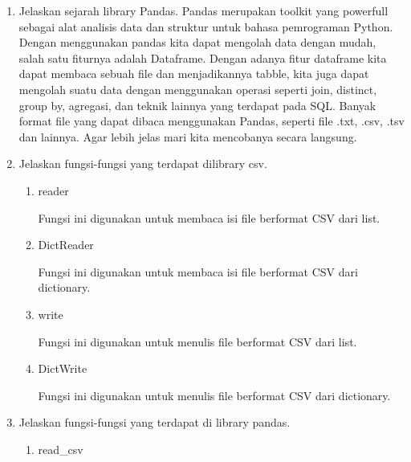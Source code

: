\begin{enumerate}
   \item Jelaskan sejarah library Pandas.
   Pandas merupakan toolkit yang powerfull sebagai alat analisis data dan struktur untuk bahasa pemrograman Python. Dengan menggunakan pandas kita dapat mengolah data dengan mudah, salah satu fiturnya adalah Dataframe. Dengan adanya fitur dataframe kita dapat membaca sebuah file dan menjadikannya tabble, kita juga dapat mengolah suatu data dengan menggunakan operasi seperti join, distinct, group by, agregasi, dan teknik lainnya yang terdapat pada SQL. Banyak format file yang dapat dibaca menggunakan Pandas, seperti file .txt, .csv, .tsv dan lainnya. Agar lebih jelas mari kita mencobanya secara langsung.
   
   \item Jelaskan fungsi-fungsi yang terdapat dilibrary csv.
      \begin{enumerate}
		   \item reader
		
		   Fungsi ini digunakan untuk membaca isi file berformat CSV dari list.
		
		   
		
		   \item DictReader
		
		   Fungsi ini digunakan untuk membaca isi file berformat CSV dari dictionary.
		
		   
		
		   \item write
		
		   Fungsi ini digunakan untuk menulis file berformat CSV dari list.
		
		   
		
		   \item DictWrite
		
		   Fungsi ini digunakan untuk menulis file berformat CSV dari dictionary.
		
		   
		
      \end{enumerate}
   \item Jelaskan fungsi-fungsi yang terdapat di library pandas.
      \begin{enumerate}
		   \item read\_csv
		

\end{enumerate}
\end{enumerate}
